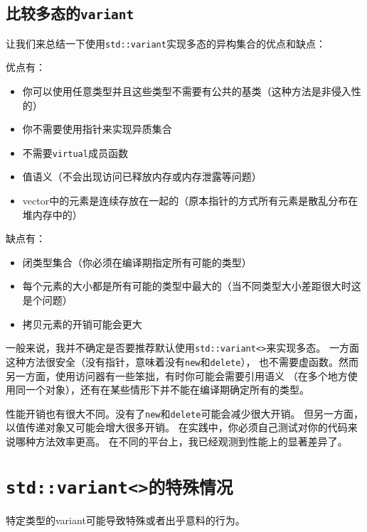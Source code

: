 \subsection{比较多态的\texttt{variant}}
让我们来总结一下使用\texttt{std::variant}实现多态的异构集合的优点和缺点：

优点有：
\begin{itemize}
    \item 你可以使用任意类型并且这些类型不需要有公共的基类（这种方法是非侵入性的）
    \item 你不需要使用指针来实现异质集合
    \item 不需要\texttt{virtual}成员函数
    \item 值语义（不会出现访问已释放内存或内存泄露等问题）
    \item vector中的元素是连续存放在一起的（原本指针的方式所有元素是散乱分布在堆内存中的）
\end{itemize}
缺点有：
\begin{itemize}
    \item 闭类型集合（你必须在编译期指定所有可能的类型）
    \item 每个元素的大小都是所有可能的类型中最大的（当不同类型大小差距很大时这是个问题）
    \item 拷贝元素的开销可能会更大
\end{itemize}
一般来说，我并不确定是否要推荐默认使用\texttt{std::variant<>}来实现多态。
一方面这种方法很安全（没有指针，意味着没有\texttt{new}和\texttt{delete}），
也不需要虚函数。然而另一方面，使用访问器有一些笨拙，有时你可能会需要引用语义
（在多个地方使用同一个对象），还有在某些情形下并不能在编译期确定所有的类型。

性能开销也有很大不同。没有了\texttt{new}和\texttt{delete}可能会减少很大开销。
但另一方面，以值传递对象又可能会增大很多开销。
在实践中，你必须自己测试对你的代码来说哪种方法效率更高。
在不同的平台上，我已经观测到性能上的显著差异了。


\section{\texttt{std::variant<>的特殊情况}}\label{ch16.5}
特定类型的variant可能导致特殊或者出乎意料的行为。

